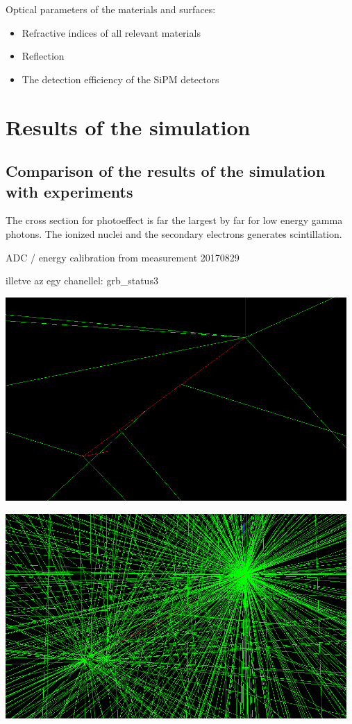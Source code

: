 \documentclass[12pt, a4paper,titlepage]{article}
\numberwithin{equation}{section}
\numberwithin{figure}{section}
\begin{document}
Optical parameters of the materials and surfaces:
\begin{itemize}
\item Refractive indices of all relevant materials
\item Reflection
\item The detection efficiency of the SiPM detectors
\end{itemize}

\section{Results of the simulation}
\subsection{Comparison of the results of the simulation with experiments}

The cross section for photoeffect is far the largest by far for low energy gamma photons.
The ionized nuclei and the secondary electrons generates scintillation.

ADC / energy calibration from measurement 20170829

illetve az egy chanellel: grb\_status3 

\includegraphics[width=130.0mm]{images/secondary.png}


\includegraphics[width=130.0mm]{images/secondary2.png}
\end{document}
